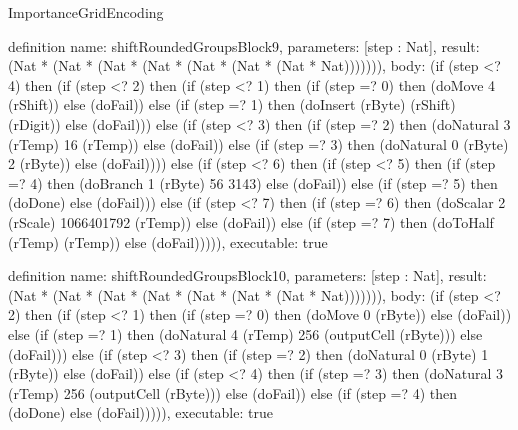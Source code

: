 \begin{lexlean}{ImportanceGridEncoding}
\begin{semanticmodule}
definition{
  name: shiftRoundedGroupsBlock9,
  parameters: [step : Nat],
  result: (Nat * (Nat * (Nat * (Nat * (Nat * (Nat * (Nat * Nat))))))),
  body: (if (step <? 4) then
      (if (step <? 2) then
      (if (step <? 1) then
      (if (step =? 0) then (doMove 4 (rShift)) else (doFail)) else
      (if (step =? 1) then (doInsert (rByte) (rShift) (rDigit)) else (doFail))) else
      (if (step <? 3) then
      (if (step =? 2) then (doNatural 3 (rTemp) 16 (rTemp)) else (doFail)) else
      (if (step =? 3) then (doNatural 0 (rByte) 2 (rByte)) else (doFail)))) else
      (if (step <? 6) then
      (if (step <? 5) then
      (if (step =? 4) then (doBranch 1 (rByte) 56 3143) else (doFail)) else
      (if (step =? 5) then (doDone) else (doFail))) else
      (if (step <? 7) then
      (if (step =? 6) then (doScalar 2 (rScale) 1066401792 (rTemp)) else (doFail)) else
      (if (step =? 7) then (doToHalf (rTemp) (rTemp)) else (doFail))))),
  executable: true
}

definition{
  name: shiftRoundedGroupsBlock10,
  parameters: [step : Nat],
  result: (Nat * (Nat * (Nat * (Nat * (Nat * (Nat * (Nat * Nat))))))),
  body: (if (step <? 2) then
      (if (step <? 1) then
      (if (step =? 0) then (doMove 0 (rByte)) else (doFail)) else
      (if (step =? 1) then (doNatural 4 (rTemp) 256 (outputCell (rByte))) else (doFail))) else
      (if (step <? 3) then
      (if (step =? 2) then (doNatural 0 (rByte) 1 (rByte)) else (doFail)) else
      (if (step <? 4) then
      (if (step =? 3) then (doNatural 3 (rTemp) 256 (outputCell (rByte))) else (doFail)) else
      (if (step =? 4) then (doDone) else (doFail))))),
  executable: true
}


\end{semanticmodule}
\end{lexlean}
